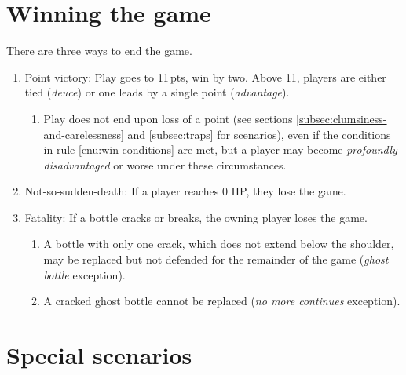 \documentclass[11pt,letterpaper,twocolumn,english,DIV=calc]{scrartcl}
\begin{document}
\section{Winning the game}
There are three ways to end the game.
\begin{enumerate}
	\item \label{enu:win-conditions}Point victory: Play goes to 11\,pts, win by two.
		Above 11, players are either tied (\emph{deuce}) or one leads by a single point (\emph{advantage}).
		\begin{enumerate}
			\item Play does not end upon loss of a point (see sections \ref{subsec:clumsiness-and-carelessness} and \ref{subsec:traps} for scenarios), even if the conditions in rule \ref{enu:win-conditions} are met, but a player may become \emph{profoundly disadvantaged} or worse under these circumstances.
		\end{enumerate}
	
	\item Not-so-sudden-death: If a player reaches 0 HP, they lose the game.

	\item Fatality: If a bottle cracks or breaks, the owning player loses the game.
	\begin{enumerate}
		\item A bottle with only one crack, which does not extend below the shoulder, may be replaced but not defended for the remainder of the game (\emph{ghost bottle} exception).
		\item A cracked ghost bottle cannot be replaced (\emph{no more continues} exception).
	\end{enumerate}
\end{enumerate}

\section{\label{sec:special-scenarios}Special scenarios}
\end{document}

